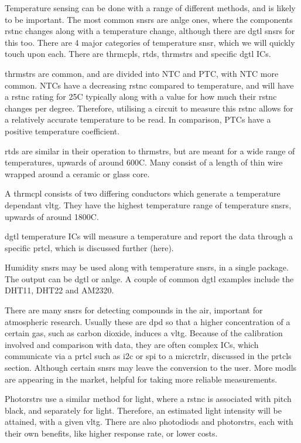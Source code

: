 \documentclass[a4paper,11pt]{report}
\begin{document}
Temperature sensing can be done with a range of different methods, and is likely to be important. The most common \gls{snsr}s are \gls{anlge} ones, where the components \gls{rstnc} changes along with a temperature change, although there are \gls{dgtl} \gls{snsr}s for this too. There are 4 major categories of temperature \gls{snsr}, which we will quickly touch upon each. There are \gls{thrmcpl}s, \gls{rtd}s, \gls{thrmstr}s and specific \gls{dgtl} ICs.

\gls{thrmstr}s are common, and are divided into NTC and PTC, with NTC more common. NTCs have a decreasing \gls{rstnc} compared to temperature, and will have a \gls{rstnc} rating for 25\degree C typically along with a value for how much their \gls{rstnc} changes per degree. Therefore, utilising a circuit to measure this \gls{rstnc} allows for a relatively accurate temperature to be read. In comparison, PTCs have a positive temperature coefficient.

\gls{rtd}s are similar in their operation to \gls{thrmstr}s, but are meant for a wide range of temperatures, upwards of around 600C. Many consist of a length of thin wire wrapped around a ceramic or glass \gls{core}.

A \gls{thrmcpl} consists of two differing conductors which generate a temperature dependant \gls{vltg}. They have the highest temperature range of temperature \gls{snsr}s, upwards of around 1800C.

\gls{dgtl} temperature ICs will measure a temperature and report the data through a specific \gls{prtcl}, which is discussed further (here).


Humidity \gls{snsr}s may be used along with temperature \gls{snsr}s, in a single package. The output can be \gls{dgtl} or \gls{anlge}. A couple of common \gls{dgtl} examples include the DHT11, DHT22 and AM2320.


There are many \gls{snsr}s for detecting compounds in the air, important for atmospheric research. Usually these are \gls{dpd} so that a higher concentration of a certain gas, such as carbon dioxide, induces a \gls{vltg}. Because of the calibration involved and comparison with data, they are often complex ICs, which communicate via a \gls{prtcl} such as \gls{i2c} or \gls{spi} to a \gls{micrctrlr}, discussed in the \gls{prtcl}s section. Although certain \gls{snsr}s may leave the conversion to the user. More \gls{modl}s are appearing in the market, helpful for taking more reliable measurements.


Photo\gls{rstr}s use a similar method for light, where a \gls{rstnc} is associated with pitch black, and separately for light. Therefore, an estimated light intensity will be attained, with a given \gls{vltg}. There are also photo\gls{diod}s and photo\gls{rstr}s, each with their own benefits, like higher response rate, or lower costs.
\end{document}

